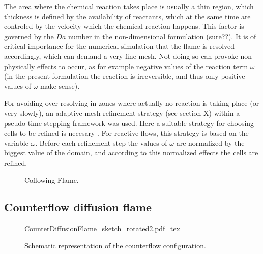 The area where the chemical reaction takes place is usually a thin region, which thickness is defined by the availability of reactants, which at the same time are controled by the velocity which the chemical reaction happens. This factor is governed by the $Da$ number in the non-dimensional formulation (sure??). It is of critical importance for the numerical simulation that the flame is resolved accordingly, which can demand a very fine mesh. Not doing so can provoke non-physically effects to occur, as for example negative values of the reaction term $\omega$ (in the present formulation the reaction is irreversible, and thus only positive values of $\omega$ make sense).

For avoiding over-resolving in zones where actually no reaction is taking place (or very slowly), an adaptive mesh refinement strategy  (see section X) within a pseudo-time-stepping framework was used.  Here a  suitable strategy for choosing cells to be refined is necesary . For reactive flows, this strategy is based on the variable $\omega$.
Before each refinement step the values of $\omega$ are normalized by the biggest value of the domain, and according to this normalized effects the cells are refined. %


\begin{figure}
	\centering
	\pgfplotsset{width=0.75 \textwidth, compat=1.3}
	\caption{Coflowing Flame.} \label{fig:CoFlowFlameFig}
\end{figure}
\subsection{Counterflow diffusion flame}\label{ss:CDF}

\begin{figure}[b]
	\begin{center}
		\def\svgwidth{0.8\textwidth}
		{CounterDiffusionFlame_sketch_rotated2.pdf_tex}
		\caption{Schematic representation of the counterflow configuration.}
		\label{fig:CDFScheme}
	\end{center}
\end{figure}

